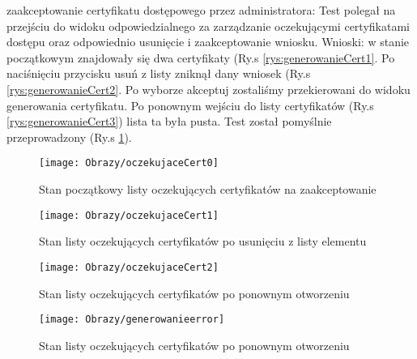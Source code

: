 \begin{enumerate*}
\begin{figure}[ht!]
	
	\end{figure}
	
	\item  zaakceptowanie certyfikatu dostępowego przez administratora: \newline
	Test polegał na przejściu do widoku odpowiedzialnego za zarządzanie oczekującymi certyfikatami dostępu oraz odpowiednio usunięcie i zaakceptowanie wniosku.
	\newline Wnioski: w stanie początkowym znajdowały się dwa certyfikaty (Ry.s \ref{rys:generowanieCert1}. Po naciśnięciu przycisku usuń z listy zniknął dany wniosek (Ry.s \ref{rys:generowanieCert2}. Po wyborze akceptuj zostaliśmy przekierowani do widoku generowania certyfikatu. Po ponownym wejściu do listy certyfikatów (Ry.s \ref{rys:generowanieCert3}) lista ta była pusta. Test został pomyślnie przeprowadzony (Ry.s \ref{rys:generowanieCert4}). 
	
		\begin{figure}[ht!]
		
		\begin{minipage}{0.2\textwidth}
			\texttt{[image: Obrazy/oczekujaceCert0]}
			\caption{Stan początkowy listy oczekujących certyfikatów na zaakceptowanie }
			\label{rys:generowanieCert1}
		\end{minipage}
		\begin{minipage}{0.2\textwidth}
			\texttt{[image: Obrazy/oczekujaceCert1]}
			\caption{Stan listy oczekujących certyfikatów po usunięciu z listy elementu}
			\label{rys:generowanieCert2}
		\end{minipage}
		
		\begin{minipage}{0.2\textwidth}
			\texttt{[image: Obrazy/oczekujaceCert2]}
			\caption{Stan listy oczekujących certyfikatów po ponownym otworzeniu}
			\label{rys:generowanieCert3}
		\end{minipage}
	
	\begin{minipage}{0.2\textwidth}
		\texttt{[image: Obrazy/generowanieerror]}
		\caption{Stan listy oczekujących certyfikatów po ponownym otworzeniu}
		\label{rys:generowanieCert4}
	\end{minipage}
	
	\end{figure}
	
	
	

\end{enumerate*}
